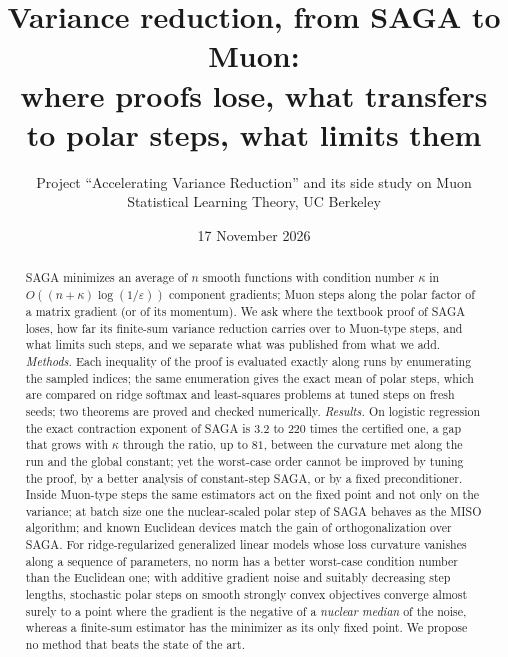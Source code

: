 \documentclass[10pt]{article}
\title{\vspace{-2.2em}Variance reduction, from SAGA to Muon:\\ where proofs lose, what transfers to polar steps, what limits them}
\author{Project ``Accelerating Variance Reduction'' and its side study on Muon\\ Statistical Learning Theory, UC Berkeley}
\date{\vspace{-0.4em}17 November 2026}
\makeatletter
\renewcommand\section{\@startsection{section}{1}{\z@}{-2.4ex \@plus -0.6ex \@minus -.2ex}{1.2ex \@plus .2ex}{\normalfont\large\bfseries}}
\makeatother
\begin{document}
\maketitle

\begin{abstract}
SAGA minimizes an average of $n$ smooth functions with condition number $\kappa$ in
$O((n+\kappa)\log(1/\varepsilon))$ component gradients; Muon steps along the polar factor of a matrix gradient (or of
its momentum). We ask where the textbook proof of SAGA loses, how far its finite-sum variance reduction carries over to
Muon-type steps, and what limits such steps, and we separate what was published from what we add.
\emph{Methods.} Each inequality of the proof is evaluated exactly along runs by enumerating the
sampled indices; the same enumeration gives the exact mean of polar steps, which are compared on ridge softmax and
least-squares problems at tuned steps on fresh seeds; two theorems are proved and checked numerically. \emph{Results.} On
logistic regression the exact contraction exponent of SAGA is $3.2$ to $220$ times the certified one, a gap that grows
with $\kappa$ through the ratio, up to $81$, between the curvature met along the run and the global constant; yet the
worst-case order cannot be improved by tuning the proof, by a better analysis of constant-step SAGA, or by a fixed
preconditioner. Inside Muon-type steps the same estimators act on the fixed point and not only on the variance; at
batch size one the nuclear-scaled polar step of SAGA behaves as the MISO algorithm; and known Euclidean devices match
the gain of orthogonalization over SAGA. For ridge-regularized generalized linear models whose loss curvature vanishes
along a sequence of parameters, no norm has a better worst-case condition number than the Euclidean one; with
additive gradient noise and suitably decreasing step lengths, stochastic polar steps on smooth strongly convex objectives converge almost surely to a point
where the gradient is the negative of a \emph{nuclear median} of the noise, whereas a finite-sum estimator has the
minimizer as its only fixed point. We propose no method that beats the state of the art.
\end{abstract}

\section{Introduction}\label{sec:intro}
\end{document}
